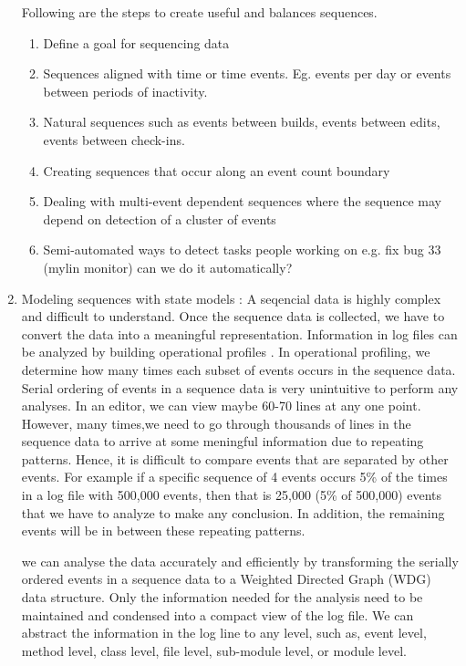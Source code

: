 \begin{enumerate}
Following are the steps to create useful  and balances sequences.
	\begin{enumerate}
	\item
	Define a goal for sequencing data
	\item
	Sequences aligned with time or time events.  Eg. events per day or events
	between periods of inactivity.
	\item
	Natural sequences such as events between builds, events between edits, events between check-ins.
	\item
	Creating sequences that occur along an event count boundary
	\item 
	Dealing with multi-event dependent sequences where the sequence may depend on detection of a cluster of events
	\item
	Semi-automated ways to detect tasks people working on e.g. fix bug 33 (mylin monitor) can we do it automatically?
	\end{enumerate}
  \item  Modeling sequences with state models : %
A seqencial data is highly complex and difficult to understand. Once the sequence data is collected, we have to convert the data into a meaningful representation. Information in log files can be analyzed by building operational profiles \cite{hmf08}\cite{nwv09}. In operational profiling, we determine how many times each subset of events occurs in the sequence data. Serial ordering of events in a sequence data is very unintuitive to perform any analyses. In an editor, we can view maybe 60-70 lines at any one point. However, many times,we need to go through thousands of lines in the sequence data to arrive at some meningful information due to repeating patterns. Hence, it is difficult to compare events that are separated by other events. For example if a specific sequence of 4 events occurs 5\% of the times in a log file with 500,000 events, then that is 25,000 (5\% of 500,000) events that we have to analyze to make any conclusion. In addition, the remaining events will be in between these repeating patterns.

we can analyse the data accurately and efficiently by transforming the serially ordered events in a sequence data to a Weighted Directed Graph (WDG) data structure. Only the information needed for the analysis need to be maintained and condensed into a compact view of the log file. We can abstract the information in the log line to any level, such as, event level, method level, class level, file level, sub-module level, or module level.


\end{enumerate}
